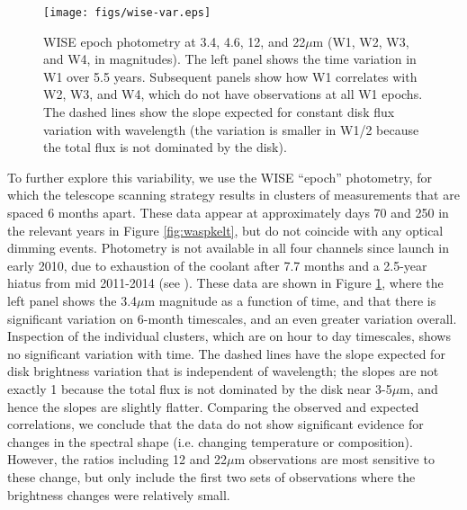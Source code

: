 \documentclass[]{rsos}
\begin{document}
\begin{figure}
  \begin{center}
    \hspace{-0.5cm} \texttt{[image: figs/wise-var.eps]}
    \caption{WISE epoch photometry at 3.4, 4.6, 12, and 22$\mu$m (W1, W2, W3, and W4, in
      magnitudes). The left panel shows the time variation in W1 over 5.5
      years. Subsequent panels show how W1 correlates with W2, W3, and W4, which do not
      have observations at all W1 epochs. The dashed lines show the slope expected for
      constant disk flux variation with wavelength (the variation is smaller in W1/2
      because the total flux is not dominated by the disk).}\label{fig:wisevar}
  \end{center}
\end{figure}

To further explore this variability, we use the WISE ``epoch'' photometry, for which the
telescope scanning strategy results in clusters of measurements that are spaced 6 months
apart. These data appear at approximately days 70 and 250 in the relevant years in Figure
\ref{fig:waspkelt}, but do not coincide with any optical dimming events. Photometry is
not available in all four channels since launch in early 2010, due to exhaustion of the
coolant after 7.7 months and a 2.5-year hiatus from mid 2011-2014 (see
\cite{2010AJ....140.1868W,2014ApJ...792...30M}). These data are shown in Figure
\ref{fig:wisevar}, where the left panel shows the 3.4$\mu$m magnitude as a function of
time, and that there is significant variation on 6-month timescales, and an even greater
variation overall. Inspection of the individual clusters, which are on hour to day
timescales, shows no significant variation with time. The dashed lines have the slope
expected for disk brightness variation that is independent of wavelength; the slopes are
not exactly 1 because the total flux is not dominated by the disk near 3-5$\mu$m, and
hence the slopes are slightly flatter. Comparing the observed and expected correlations,
we conclude that the data do not show significant evidence for changes in the spectral
shape (i.e. changing temperature or composition). However, the ratios including 12 and
22$\mu$m observations are most sensitive to these change, but only include the first two
sets of observations where the brightness changes were relatively small.
\end{document}
